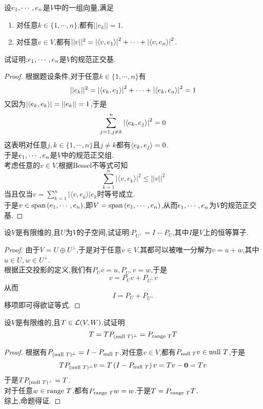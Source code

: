 \documentclass{ctexart}
\begin{document}
\begin{problem}[4.]
    设${e}_1,\cdots,{e}_{n}$是$V$中的一组向量,满足
    \begin{enumerate}[label=\tbf{(\alph*)}]
        \item 对任意$k\in\{1,\cdots,n\}$,都有$||e_k||=1$.
        \item 对任意$v\in V$,都有$||v||^2=\left|\left\langle{v},{e_1}\right\rangle\right|^2+\cdots+\left|\left\langle{v},{e_n}\right\rangle\right|^2$.
    \end{enumerate}
    试证明:${e}_1,\cdots,{e}_{n}$是$V$的规范正交基.
\end{problem}
\begin{proof}
    根据题设条件,对于任意$k\in\{1,\cdots,n\}$有
    \[||e_k||^2=\left|\left\langle{e_k},{e_1}\right\rangle\right|^2+\cdots+\left|\left\langle{e_k},{e_n}\right\rangle\right|^2=1\]
    又因为$\left|\left\langle{e_k},{e_k}\right\rangle\right|=||e_k||=1$,于是
    \[\sum_{j=1,j\neq k}^{n}\left|\left\langle{e_k},{e_j}\right\rangle\right|^2=0\]
    这表明对任意$j,k\in\{1,\cdots,n\}$且$j\neq k$都有$\left\langle{e_k},{e_j}\right\rangle=0$.\\
    于是${e}_1,\cdots,{e}_{n}$是$V$中的规范正交组.\\
    考虑任意的$v\in V$,根据Bessel不等式可知
    \[\sum_{k=1}^{n}|\langle v,e_k\rangle|^2\leqslant||v||^2\]
    当且仅当$\displaystyle v=\sum_{k=1}^{n}|\langle v,e_k\rangle|e_k$时等号成立.\\
    于是$v\in\text{span}\left({e}_1,\cdots,{e}_{n}\right)$,即$V=\text{span}\left({e}_1,\cdots,{e}_{n}\right)$,从而${e}_1,\cdots,{e}_{n}$为$V$的规范正交基.
\end{proof}
\begin{problem}[5.]
    设$V$是有限维的,且$U$为$V$的子空间,试证明:$P_{U^\bot}=I-P_U$,其中$I$是$V$上的恒等算子.
\end{problem}
\begin{proof}
    由于$V=U\oplus U^\bot$,于是对于任意$v\in V$,其都可以被唯一分解为$v=u+w$,其中$u\in U,w\in U^\bot$.\\
    根据正交投影的定义,我们有$P_Uv=u,P_{U^\bot}v=w$,于是
    \[v=P_Uv+P_{U^\bot}v\]
    从而
    \[I=P_U+P_{U^\bot}\]
    移项即可得欲证等式.
\end{proof}
\begin{problem}[6.]
    设$V$是有限维的,且$T\in\mathcal{L}(V,W)$.试证明
    \[T=TP_{(\text{null } T)^\bot}=P_{\text{range } T}T\]
\end{problem}
\begin{proof}
    根据有$P_{(\text{null } T)^\bot}=I-P_{\text{null } T}$.对任意$v\in V$,都有$P_{\text{null } T}v\in\text{null } T$,于是
    \[TP_{(\text{null } T)^\bot}v=T\left(I-P_{\text{null } T}\right)v=Tv-\mathbf0=Tv\]
    于是$TP_{(\text{null } T)^\bot}=T$.\\
    对于任意$w\in\text{range } T$,都有$P_{\text{range } T}w=w$.于是$T=P_{\text{range } T}T$.\\
    综上,命题得证.
\end{proof}
\end{document}

